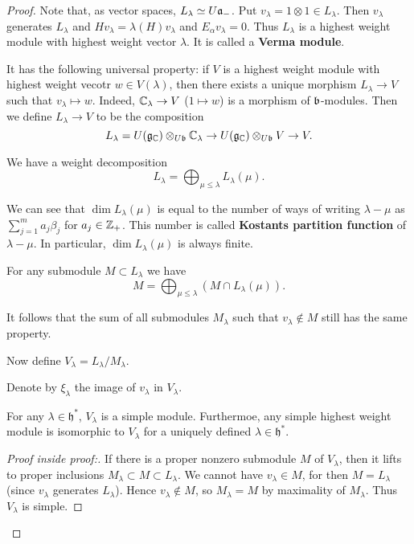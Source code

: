 \documentclass[11pt, english]{article}
\begin{document}
\begin{proof}
Note that, as vector spaces, $L_\lambda \simeq U \mathfrak{a}_-$. Put $v_\lambda = 1 \otimes 1 \in L_\lambda$. Then $v_\lambda$ generates $L_\lambda$ and $Hv_\lambda = \lambda(H) v_\lambda$ and $E_\alpha v_\lambda = 0$. Thus $L_\lambda$ is a highest weight module with highest weight vector $\lambda$. It is called a \textbf{Verma module}. 

It has the following universal property: if $V$ is a highest weight module with highest weight vecotr $w \in V(\lambda)$, then there exists a unique morphism $L_\lambda \to V$ such that $v_\lambda \mapsto w$. Indeed, $\mathbb{C}_\lambda \to V$ ($1 \mapsto w$) is a morphism of $\mathfrak{b}$-modules. Then we define $L_\lambda \to V$ to be the composition
$$
L _\lambda = U(\mathfrak g_{\mathbb{C}}) \otimes_{U\mathfrak{b}} \mathbb{C}_\lambda \to U(\mathfrak g_{\mathbb{C}}) \otimes_{U \mathfrak{b}} V \to V.
$$

We have a weight decomposition 
$$
L_\lambda = \bigoplus_{\mu \leq \lambda} L_\lambda(\mu).
$$

We can see that $\dim L_\lambda(\mu)$ is equal to the number of ways of writing $\lambda-\mu$ as $\sum_{j=1}^m a_j \beta_j$ for $a_j \in \mathbb{Z}_+$. This number is called \textbf{Kostants partition function} of $\lambda-\mu$. In particular, $\dim L_\lambda(\mu)$ is always finite.

For any submodule $M \subset L_\lambda$ we have
$$
M = \bigoplus_{\mu \leq \lambda} (M \cap L_\lambda(\mu)).
$$

It follows that the sum of all submodules $M_\lambda$ such that $v_\lambda \not \in M$ still has the same property. 

Now define $V_\lambda = L_\lambda / M_\lambda$.

Denote by $\xi_\lambda$ the image of $v_\lambda$ in $V_\lambda$. 

\begin{lemma}
For any $\lambda \in \mathfrak h^\ast$, $V_\lambda$  is a simple module. Furthermoe, any simple highest weight module is isomorphic to $V_\lambda$ for a uniquely defined $\lambda \in \mathfrak h^\ast$. 
\end{lemma}
\begin{proof}[Proof inside proof:]

If there is a proper nonzero submodule $M$ of $V_\lambda$, then it lifts to proper inclusions $M_\lambda \subset M \subset L_\lambda$. We cannot have $v_\lambda \in M$, for then $M=L_\lambda$ (since $v_\lambda$ generates $L_\lambda$). Hence $v_\lambda \not \in M$, so $M_\lambda = M$ by maximality of $M_\lambda$. Thus $V_\lambda$ is simple.


\end{proof}
\end{proof}
\end{document}
